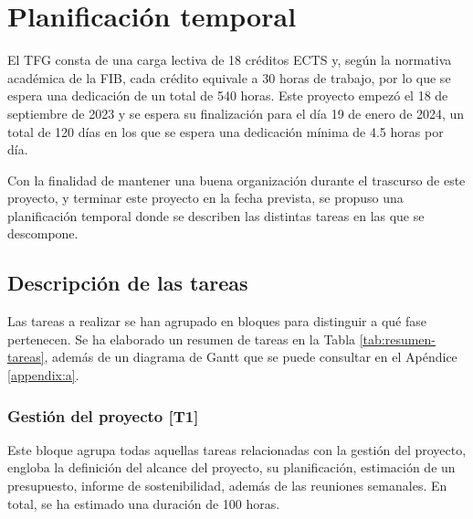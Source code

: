 
\chapter{Planificación temporal}\label{chapter:planificacion}

El TFG consta de una carga lectiva de 18 créditos ECTS y, según la normativa académica de la FIB, cada crédito equivale a 30 horas de trabajo, por lo que se espera una dedicación de un total de 540 horas. Este proyecto empezó el 18 de septiembre de 2023 y se espera su finalización para el día 19 de enero de 2024, un total de 120 días en los que se espera una dedicación mínima de 4.5 horas por día.

Con la finalidad de mantener una buena organización durante el trascurso de este proyecto, y terminar este proyecto en la fecha prevista, se propuso una planificación temporal donde se describen las distintas tareas en las que se descompone. 

\section{Descripción de las tareas}

Las tareas a realizar se han agrupado en bloques para distinguir a qué fase pertenecen. Se ha elaborado un resumen de tareas en la Tabla \ref{tab:resumen-tareas}, además de un diagrama de Gantt que se puede consultar en el Apéndice \ref{appendix:a}.

\subsection{Gestión del proyecto [T1]}

Este bloque agrupa todas aquellas tareas relacionadas con la gestión del proyecto, engloba la definición del alcance del proyecto, su planificación, estimación de un presupuesto, informe de sostenibilidad, además de las reuniones semanales. En total, se ha estimado una duración de 100 horas.

